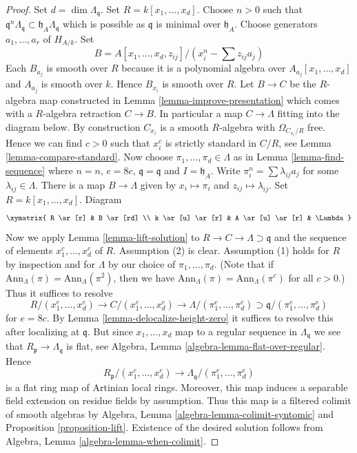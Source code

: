 \begin{proof}
Set $d = \dim \Lambda_\mathfrak q$. Set $R = k[x_1, \ldots, x_d]$.
Choose $n > 0$ such that
$\mathfrak q^n\Lambda_\mathfrak q \subset \mathfrak h_A\Lambda_\mathfrak q$
which is possible as $\mathfrak q$ is minimal over $\mathfrak h_A$.
Choose generators $a_1, \ldots, a_r$ of $H_{A/k}$. Set
$$
B = A[x_1, \ldots, x_d, z_{ij}]/(x_i^n - \sum z_{ij}a_j)
$$
Each $B_{a_j}$ is smooth over $R$ because it is a polynomial
algebra over $A_{a_j}[x_1, \ldots, x_d]$ and $A_{a_j}$ is smooth over $k$.
Hence $B_{x_i}$ is smooth over $R$. Let $B \to C$ be the $R$-algebra
map constructed in Lemma \ref{lemma-improve-presentation}
which comes with a $R$-algebra retraction $C \to B$. In particular
a map $C \to \Lambda$ fitting into the diagram below.
By construction $C_{x_i}$ is a smooth $R$-algebra with
$\Omega_{C_{x_i}/R}$ free. Hence we can find $c > 0$
such that $x_i^c$ is strictly standard in $C/R$, see
Lemma \ref{lemma-compare-standard}.
Now choose $\pi_1, \ldots, \pi_d \in \Lambda$ as in
Lemma \ref{lemma-find-sequence}
where $n = n$, $e = 8c$, $\mathfrak q = \mathfrak q$ and $I = \mathfrak h_A$.
Write $\pi_i^n = \sum \lambda_{ij} a_j$ for some $\lambda_{ij} \in \Lambda$.
There is a map $B \to \Lambda$ given by $x_i \mapsto \pi_i$
and $z_{ij} \mapsto \lambda_{ij}$. Set $R = k[x_1, \ldots, x_d]$.
Diagram
$$
\xymatrix{
R \ar[r] & B \ar[rd] \\
k \ar[u] \ar[r] & A \ar[u] \ar[r] & \Lambda
}
$$
Now we apply
Lemma \ref{lemma-lift-solution}
to $R \to C \to \Lambda \supset \mathfrak q$
and the sequence of elements $x_1^c, \ldots, x_d^c$ of $R$.
Assumption (2) is clear. Assumption (1) holds for $R$
by inspection and for $\Lambda$ by our choice of
$\pi_1, \ldots, \pi_d$. (Note that if
$\text{Ann}_\Lambda(\pi) = \text{Ann}_\Lambda(\pi^2)$, then we have
$\text{Ann}_\Lambda(\pi) = \text{Ann}_\Lambda(\pi^c)$ for all $c > 0$.)
Thus it suffices to resolve
$$
R/(x_1^e, \ldots, x_d^e) \to C/(x_1^e, \ldots, x_d^e) \to
\Lambda/(\pi_1^e, \ldots, \pi_d^e) \supset
\mathfrak q/(\pi_1^e, \ldots, \pi_d^e)
$$
for $e = 8c$. By
Lemma \ref{lemma-delocalize-height-zero}
it suffices to resolve this after localizing at $\mathfrak q$.
But since $x_1, \ldots, x_d$ map to a regular sequence
in $\Lambda_\mathfrak q$ we see that $R_\mathfrak p \to \Lambda_\mathfrak q$
is flat, see Algebra, Lemma \ref{algebra-lemma-flat-over-regular}. Hence
$$
R_\mathfrak p/(x_1^e, \ldots, x_d^e) \to
\Lambda_\mathfrak q/(\pi_1^e, \ldots, \pi_d^e)
$$
is a flat ring map of Artinian local rings.
Moreover, this map induces a separable field extension
on residue fields by assumption. Thus this map is a filtered colimit
of smooth algebras by
Algebra, Lemma \ref{algebra-lemma-colimit-syntomic}
and Proposition \ref{proposition-lift}.
Existence of the desired solution follows from
Algebra, Lemma \ref{algebra-lemma-when-colimit}.
\end{proof}






